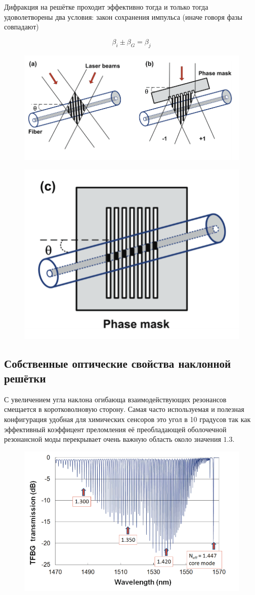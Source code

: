 \par
Дифракция на решётке проходит эффективно тогда и только тогда удоволетворены два условия: закон сохранения импульса (иначе говоря фазы совпадают)


$$\beta_{i} \pm \beta_{G}=\beta_{j}$$ 

\begin{figure}
	\centering
	\includegraphics[width=0.7\linewidth]{screenshot005}
	\caption{}
	\label{fig:screenshot005}
\end{figure}


\begin{figure}[h]
	\centering
	\includegraphics[width=0.4\linewidth]{screenshot004}
	\caption{}
	\label{fig:screenshot004}
\end{figure}

\subsection{Собственные оптические свойства наклонной решётки}

С увеличением угла наклона огибающа взаимодействующих резонансов смещается в коротковолновую сторону. Самая часто используемая и полезная конфигурация удобная для химических сенсоров это угол в 10 градусов так как эффективный коэффицент преломления её преобладающей оболочечной резонансной моды перекрывает очень важную область около значения $ 1.3 $.
\begin{figure}
	\centering
	\includegraphics[width=0.7\linewidth]{screenshot006}
	\caption{}
	\label{fig:screenshot006}
\end{figure}


